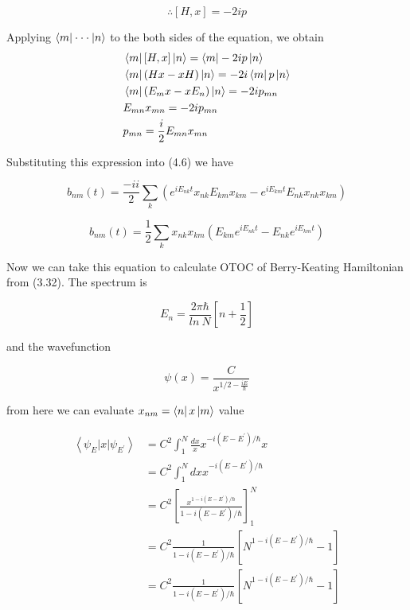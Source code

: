 \documentclass[12pt]{report}
\newcommand*{\1}{\hspace{1pt}}
\begin{document}
        \begin{equation}
            \therefore [H,x] = -2ip
        \end{equation}

        Applying $\bra{m}\cdot \cdot \cdot\ket{n}$ to the both sides of the equation, we obtain
        \begin{align*}
            &\bra{m}[H,x]\ket{n} = \bra{m}-2ip\ket{n} \\ 
            &\bra{m}(Hx-xH)\ket{n} = -2i\bra{m}p\ket{n} \\ 
            &\bra{m}(E_{m}x-xE_{n})\ket{n} = -2ip_{mn} \\ 
            &E_{mn}x_{mn} = -2ip_{mn} \\ 
            &p_{mn} = \frac{i}{2}E_{mn}x_{mn} \\  
        \end{align*}

        Substituting this expression into (4.6) we have 

        \begin{equation*}
            b_{nm}(t) = \frac{-i i}{2}\sum_{k} (e^{i E _{nk}t}x_{nk}E_{km}x_{km} - e^{iE_{km}t}E_{nk}x_{nk}x_{km}) 
        \end{equation*}
        
        \begin{equation}
            b_{nm}(t) = \frac{1}{2}\sum_{k} x_{nk}x_{km}(E_{km}e^{i E _{nk}t} - E_{nk}e^{iE_{km}t}) 
        \end{equation}
        
        Now we can take this equation to calculate OTOC of Berry-Keating Hamiltonian from (3.32). The spectrum is 

        \begin{equation}
            E_{n} = \frac{2\pi\hbar}{ln\ N}\left[n + \frac{1}{2}\right] 
        \end{equation}
        
        and the wavefunction 
        
        \begin{equation}
            \psi(x) = \frac{C}{x^{1/2 - \frac{iE}{\hbar}}}
        \end{equation}

        from here we can evaluate $x_{nm} = \bra{n}x\ket{m}$ value

        \begin{align*}
            \left\langle\psi_{E}| x |\psi_{E^{'}}\right\rangle &= C^{2} \int_{1}^{N} \frac{dx}{x} x^{-i(E-E^{'})/\hbar} x \\ 
            &= C^{2} \int_{1}^{N} dx x^{-i(E-E^{'})/\hbar} \\
            &= C^{2} \left[\frac{x^{1-i(E-E^{'})/\hbar}}{1-i(E-E^{'})/\hbar}\right]_{1}^{N} \\
            &= C^{2} \frac{1}{1-i(E-E^{'})/\hbar}\left[N^{1-i(E-E^{'})/\hbar} - 1\right] \\
            &= C^{2} \frac{1}{1-i(E-E^{'})/\hbar}\left[N^{1-i(E-E^{'})/\hbar} - 1\right] \\
        \end{align*}
\end{document}
